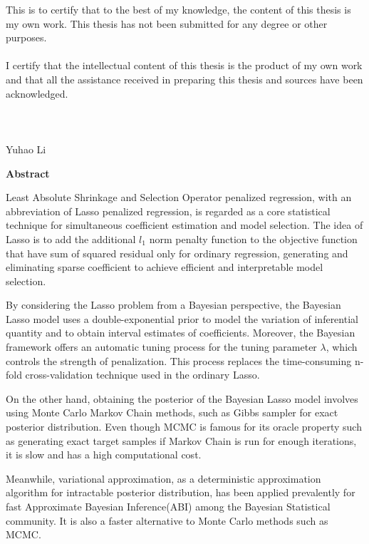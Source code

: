 \noindent This is to certify that to the best of my knowledge, the content of this thesis is my own work. This thesis has not been submitted for any degree or other purposes.\\
\\
\noindent I certify that the intellectual content of this thesis is the product of my own work and that all the assistance received in preparing this thesis and sources have been acknowledged.\\
\\
\\
\\
Yuhao Li

\pagebreak
\hspace{0pt}

\begin{center}
    \textbf{\large Abstract }\\
    \vspace{0.5cm}
\end{center}
Least Absolute Shrinkage and Selection Operator penalized regression, with an abbreviation of Lasso penalized regression, is regarded as a core statistical technique for simultaneous coefficient estimation and model selection. The idea of Lasso is to add the additional $l_1$ norm penalty function to the objective function that have sum of squared residual only for ordinary regression, generating and eliminating sparse coefficient to achieve efficient and interpretable model selection.

By considering the Lasso problem from a Bayesian perspective, the Bayesian Lasso model uses a double-exponential prior to model the variation of inferential quantity and to obtain interval estimates of coefficients. Moreover, the Bayesian framework offers an automatic tuning process for the tuning parameter $\lambda$, which controls the strength of penalization. This process replaces the time-consuming n-fold cross-validation technique used in the ordinary Lasso.

On the other hand, obtaining the posterior of the Bayesian Lasso model involves using Monte Carlo Markov Chain methods, such as Gibbs sampler for exact posterior distribution. Even though MCMC is famous for its oracle property such as generating exact target samples if Markov Chain is run for enough iterations, it is slow and has a high computational cost. 

Meanwhile, variational approximation, as a deterministic approximation algorithm for intractable posterior distribution, has been applied prevalently for fast Approximate Bayesian Inference(ABI) among the Bayesian Statistical community. It is also a faster alternative to Monte Carlo methods such as MCMC.

